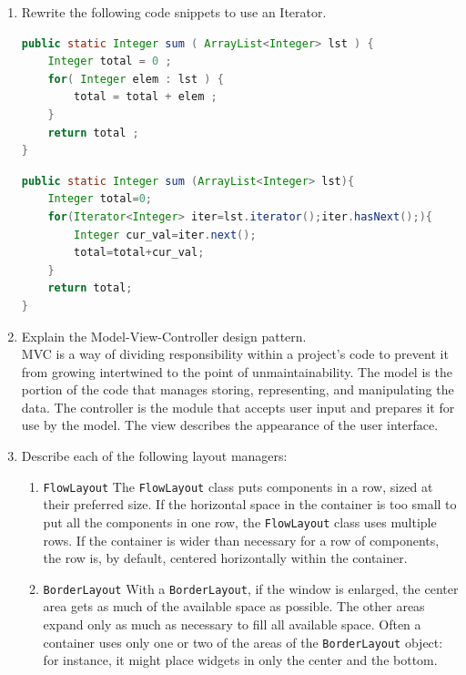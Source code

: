 \documentclass[11pt]{article}
\newenvironment{answer}{\large\lstset{basicstyle=\tiny\ttfamily}\color{white} }{}
\newenvironment{answer}{\large\lstset{basicstyle=\large\ttfamily}\color{red} }{}
\begin{document}
\begin{enumerate}
\vspace{24pt}
\item Rewrite the following code snippets to use an Iterator.
\begin{lstlisting}[language=java]
public static Integer sum ( ArrayList<Integer> lst ) {
	Integer total = 0 ;
	for( Integer elem : lst ) {
		total = total + elem ;
	}
	return total ;
}
\end{lstlisting}
\begin{answer}
\begin{lstlisting}[language=java]
public static Integer sum (ArrayList<Integer> lst){
	Integer total=0;
	for(Iterator<Integer> iter=lst.iterator();iter.hasNext();){
		Integer cur_val=iter.next(); 
		total=total+cur_val;
	}
	return total;
}
\end{lstlisting}
\end{answer}


\vspace{24pt}
\item Explain the Model-View-Controller design pattern. \\
\begin{answer}
MVC is a way of dividing responsibility within a project's code to prevent it from growing intertwined to the point of unmaintainability.
The model is the portion of the code that manages storing, representing, and manipulating the data.
The controller is the module that accepts user input and prepares it for use by the model.
The view describes the appearance of the user interface.
\end{answer}


\newpage
\item Describe each of the following layout managers:
\begin{enumerate}

\item \texttt{FlowLayout}
\begin{answer}
The \texttt{FlowLayout} class puts components in a row, sized at their preferred size. If the horizontal space in the container is too small to put all the components in one row, the \texttt{FlowLayout} class uses multiple rows. If the container is wider than necessary for a row of components, the row is, by default, centered horizontally within the container. \end{answer}

\item \texttt{BorderLayout}
\begin{answer}
With a \texttt{BorderLayout}, if the window is enlarged, the center area gets as much of the available space as possible. The other areas expand only as much as necessary to fill all available space. Often a container uses only one or two of the areas of the \texttt{BorderLayout} object: for instance, it might place widgets in only the center and the bottom. \end{answer}


\end{enumerate}
\end{enumerate}
\end{document}
